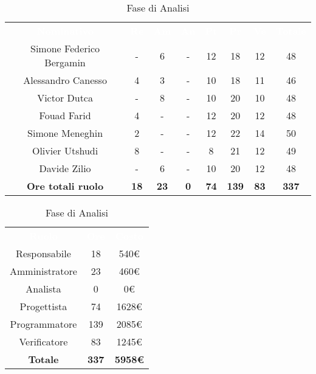 \renewcommand{\arraystretch}{1.5}

\begin{comment}
BASE PER TUTTI: 48 ORE
Canesso: -2 ore perchè deve studiare per gli arretrati (4)
Utshudi: +1 ore perchè meno arretrati (-1 ora rispetto a Meneghin perchè il proj di TecWeb porta via tempo)
Meneghin: +2 ore (solo analisi)
\end{comment}

\begin{table}[H]
\centering\renewcommand{\arraystretch}{1.5}
\caption{Fase di Analisi}
\vspace{0.2cm}
\begin{tabular}{ c | c | c | c | c | c | c | c }
\rowcolor{redafk}
\textcolor{white}{\textbf{Nominativo}} & \textcolor{white}{\textbf{Re}} & 
\textcolor{white}{\textbf{Am}} & \textcolor{white}{\textbf{An}} &
\textcolor{white}{\textbf{Pt}} & \textcolor{white}{\textbf{Pr}} &
\textcolor{white}{\textbf{Ve}} & \textcolor{white}{\textbf{Totale}} \\
Simone Federico Bergamin & - & 6 & - & 12 & 18 & 12 & 48 \\
Alessandro Canesso & 4 & 3 & - & 10 & 18 & 11 & 46 \\
Victor Dutca & - & 8 & - & 10 & 20 & 10 & 48 \\
Fouad Farid	& 4 & - & - & 12 & 20 & 12 & 48 \\
Simone Meneghin & 2 & - & - & 12 & 22 & 14 & 50 \\
Olivier Utshudi & 8 & - & - & 8 & 21 & 12 & 49 \\
Davide Zilio & - & 6 & - & 10 & 20 & 12 & 48 \\
\rowcolor{lastrowcolor}
\textbf{Ore totali ruolo} & \textbf{18} & \textbf{23} & \textbf{0} & \textbf{74} & \textbf{139} & \textbf{83} & \textbf{337} \\
\end{tabular}
\end{table}


\begin{table}[H]
\centering\renewcommand{\arraystretch}{1.5}
\caption{Fase di Analisi}
\vspace{0.2cm}
\begin{tabular}{ c | c | c  }
\rowcolor{redafk}
\textcolor{white}{\textbf{Ruolo}} & \textcolor{white}{\textbf{Ore}} & 
\textcolor{white}{\textbf{Costo}}  \\
Responsabile & 18 & 540€ \\
Amministratore & 23 & 460€ \\
Analista & 0 & 0€ \\
Progettista	& 74 & 1628€ \\
Programmatore & 139 & 2085€  \\
Verificatore & 83 & 1245€  \\
\rowcolor{lastrowcolor}
\textbf{Totale} & \textbf{337} & \textbf{5958€}  \\
\end{tabular}
\end{table}
